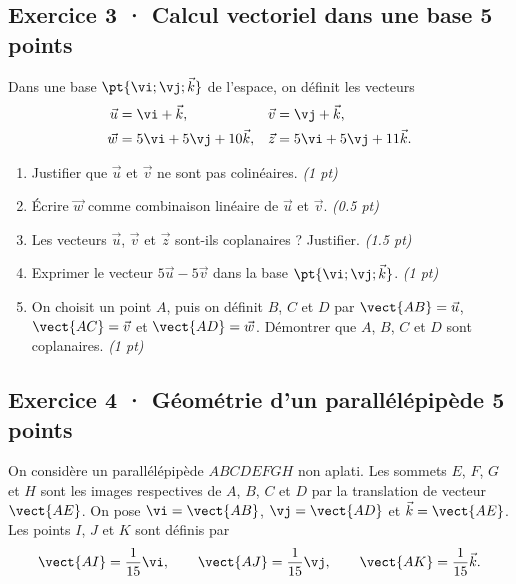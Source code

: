\mxnewpage{}

\subsection*{Exercice 3 · Calcul vectoriel dans une base \hfill 5 points}Dans une base $\pt{\vi;\vj;\vec k}$ de l'espace, on définit les vecteurs
\[\begin{aligned}\vec u&=\vi+\vec k,&\vec v&=\vj+\vec k,\\
\vec w&=5\vi+5\vj+10\vec k,&\vec z&=5\vi+5\vj+11\vec k.\end{aligned}\]

\begin{enumerate}

\item Justifier que $\vec u$ et $\vec v$ ne sont pas colinéaires. \hfill\textit{(1 pt)}

\item Écrire $\vec w$ comme combinaison linéaire de $\vec u$ et $\vec v$. \hfill\textit{(\num{0,5} pt)}

\item Les vecteurs $\vec u$, $\vec v$ et $\vec z$ sont-ils coplanaires ? Justifier. \hfill\textit{(\num{1,5} pt)}

\item Exprimer le vecteur $5\vec u-5\vec v$ dans la base $\pt{\vi;\vj;\vec k}$. \hfill\textit{(1 pt)}

\item On choisit un point $A$, puis on définit $B$, $C$ et $D$ par $\vect{AB}=\vec u$, $\vect{AC}=\vec v$ et $\vect{AD}=\vec w$. Démontrer que $A$, $B$, $C$ et $D$ sont coplanaires. \hfill\textit{(1 pt)}

\end{enumerate}

\subsection*{Exercice 4 · Géométrie d'un parallélépipède \hfill 5 points}On considère un parallélépipède $ABCDEFGH$ non aplati. Les sommets $E$, $F$, $G$ et $H$ sont les images respectives de $A$, $B$, $C$ et $D$ par la translation de vecteur $\vect{AE}$.
On pose $\vi=\vect{AB}$, $\vj=\vect{AD}$ et $\vec k=\vect{AE}$.
Les points $I$, $J$ et $K$ sont définis par
\[\vect{AI}=\frac1{15}\vi,\qquad\vect{AJ}=\frac1{15}\vj,\qquad\vect{AK}=\frac1{15}\vec k.\]

